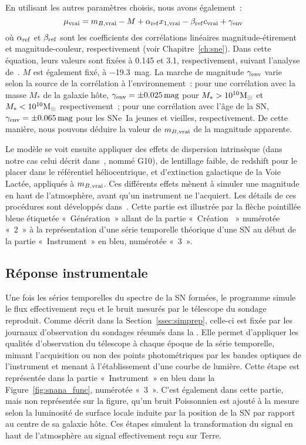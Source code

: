 \documentclass[../main/main.tex]{subfiles}
\begin{document}
En utilisant les autres paramètres choisis, nous avons également~:
\begin{equation}\label{eq:mutrue}
    \mu_{\rm vrai} = m_{B, \rm vrai} - M + \alpha_{\rm ref} x_{1, \rm vrai} -
    \beta_{\rm ref} c_{\rm vrai}+ \gamma_{\rm env}
\end{equation}
où $\alpha_{\rm ref}$ et $\beta_{\rm ref}$ sont les coefficients des
corrélations linéaires magnitude-étirement et magnitude-couleur, respectivement
(voir Chapitre~\ref{ch:sne}). Dans cette équation, leurs valeurs sont fixées à
\num{0.145} et \num{3.1}, respectivement, suivant l'analyse
de~\cite{popovic2021a}. $M$ est également fixé, à \SI{-19.3}{mag}. La marche de
magnitude $\gamma_{\rm env}$ varie selon la source de la corrélation à
l'environnement~: pour une corrélation avec la masse $M_*$ de la galaxie hôte,
$\gamma_{\rm env} = \pm \SI{0.025}{mag}$ pour $M_* > 10^{10}\si{\Msun}$ et $M_*
< 10^{10}\si{\Msun}$ respectivement~; pour une corrélation avec l'âge de la SN,
$\gamma_{\rm env} = \pm \SI{0.065}{mag}$ pour les SNe~Ia jeunes et vieilles,
respectivement. De cette manière, nous pouvons déduire la valeur de $m_{B, \rm
vrai}$ de la magnitude apparente.

Le modèle se voit ensuite appliquer des effets de dispersion intrinsèque (dans
notre cas celui décrit dans~\cite{guy2010}, nommé
G10), de lentillage faible, de redshift pour le
placer dans le référentiel héliocentrique, et d'extinction galactique de la Voie
Lactée, appliqués à $m_{B, \rm vrai}$. Ces différents effets mènent à simuler
une magnitude en haut de l'atmosphère, avant qu'un instrument ne l'acquiert. Les
détails de ces procédures sont développés dans~\cite{kessler2019}. Cette partie
est illustrée par la flèche pointillée bleue étiquetée «~Génération~» allant de
la partie «~Création \hostlib~» numérotée «~2~» à la représentation d'une série
temporelle théorique d'une SN au début de la partie «~Instrument~» en bleu,
numérotée «~3~».

\subsection{Réponse instrumentale}\label{ssec:siminst}

Une fois les séries temporelles du spectre de la SN formées, le programme simule
le flux effectivement reçu et le bruit mesurés par le télescope du sondage
reproduit. Comme décrit dans la Section~\ref{ssec:simprep}, celle-ci est fixée
par les journaux d'observation du sondages résumés dans la \simlib. Elle permet
d'appliquer les qualités d'observation du télescope à chaque époque de la série
temporelle, mimant l'acquisition ou non des points photométriques par les bandes
optiques de l'instrument et menant à l'établissement d'une courbe de lumière.
Cette étape est représentée dans la partie «~Instrument~» en bleu dans la
Figure~\ref{fig:snana_func}, numérotée «~3~». C'est également dans cette partie,
mais non représentée sur la figure, qu'un bruit Poissonnien est ajouté à la
mesure selon la luminosité de surface locale induite par la position de la SN
par rapport au centre de sa galaxie hôte. Ces étapes simulent la transformation
du signal en haut de l'atmosphère au signal effectivement reçu sur Terre.
\end{document}
